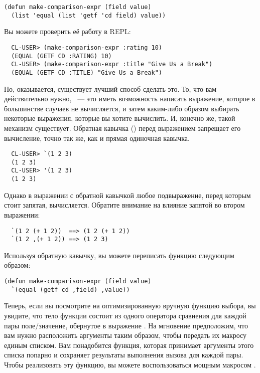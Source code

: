 \begin{lstlisting}
(defun make-comparison-expr (field value)
  (list 'equal (list 'getf 'cd field) value))
\end{lstlisting}

Вы можете проверить её работу в REPL:

\begin{verbatim}
  CL-USER> (make-comparison-expr :rating 10)
  (EQUAL (GETF CD :RATING) 10)
  CL-USER> (make-comparison-expr :title "Give Us a Break")
  (EQUAL (GETF CD :TITLE) "Give Us a Break")
\end{verbatim}

Но, оказывается, существует лучший способ сделать это. То, что вам действительно нужно,
~--- это иметь возможность написать выражение, которое в большинстве случаев не
вычисляется, и затем каким-либо образом выбирать некоторые выражения, которые вы хотите
вычислить. И, конечно же, такой механизм существует. Обратная кавычка () перед
выражением запрещает его вычисление, точно так же, как и прямая одиночная кавычка.

\begin{verbatim}
  CL-USER> `(1 2 3)
  (1 2 3)
  CL-USER> '(1 2 3)
  (1 2 3)
\end{verbatim}

Однако в выражении с обратной кавычкой любое подвыражение, перед которым стоит запятая,
вычисляется. Обратите внимание на влияние запятой во втором выражении:

\begin{verbatim}
  `(1 2 (+ 1 2))  ==> (1 2 (+ 1 2))
  `(1 2 ,(+ 1 2)) ==> (1 2 3)
\end{verbatim}

Используя обратную кавычку, вы можете переписать функцию  следующим образом:

\begin{lstlisting}
(defun make-comparison-expr (field value)
  `(equal (getf cd ,field) ,value))
\end{lstlisting}

Теперь, если вы посмотрите на оптимизированную вручную функцию выбора, вы увидите, что
тело функции состоит из одного оператора сравнения для каждой пары поле/значение,
обернутое в выражение . На мгновение предположим, что вам нужно расположить
аргументы таким образом, чтобы передать их макросу  единым списком. Вам
понадобится функция, которая принимает аргументы этого списка попарно и сохраняет
результаты выполнения вызова  для каждой пары. Чтобы
реализовать эту функцию, вы можете воспользоваться мощным макросом .

